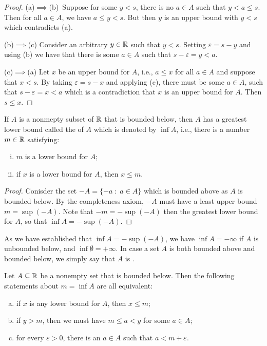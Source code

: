 \documentclass[11pt,a4paper]{article}
\begin{document}
\begin{proof}
    (a)$\implies$(b)\ Suppose for some $y<s$, there is no $a\in A$ such that $y<a\le s$. Then for all $a\in A$, we have $a\le y<s$. But then $y$ is an upper bound with $y<s$ which contradicts (a). 

    \noindent(b)$\implies$(c) Consider an arbitrary $y\in\mathbb{R}$ such that $y<s$. Setting $\varepsilon = s-y$ and using (b) we have that there is some $a\in A$ such that $s-\varepsilon = y<a$. 

    \noindent(c)$\implies$(a) Let $x$ be an upper bound for $A$, i.e., $a\le x$ for all $a\in A$ and suppose that $x<s$. By taking $\varepsilon = s-x$ and applying (c), there must be some $a\in A$, such that $s-\varepsilon = x<a$ which is a contradiction that $x$ is an upper bound for $A$. Then $s\le x$.
\end{proof}

\begin{theorem}
    If $A$ is a nonmepty subset of $\mathbb{R}$ that is bounded below, then $A$ has a greatest lower bound called the  of $A$ which is denoted by $\inf A$, i.e., there is a number $m\in \mathbb{R}$ satisfying:
    \begin{enumerate}[(i)]
        \item $m$ is a lower bound for $A$;
        \item if $x$ is a lower bound for $A$, then $x\le m$.
    \end{enumerate}
\end{theorem}

\begin{proof}
    Conisder the set $-A = \{-a\;:\;a\in A\}$ which is bounded above as $A$ is bounded below. By the completeness axiom, $-A$ must have a least upper bound $m = \sup (-A)$. Note that $-m = -\sup (-A)$ then the greatest lower bound for $A$, so that $\inf A = -\sup (-A)$.  
\end{proof}

\begin{remark}
    As we have established that $\inf A = -\sup (-A)$, we have $\inf A = -\infty$ if $A$ is unbounded below, and $\inf \emptyset = +\infty$. In case a set $A$ is both bounded above and bounded below, we simply say that $A$ is .
\end{remark}

\begin{proposition}
    Let $A\subseteq \mathbb{R}$ be a nonempty set that is bounded below. Then the following statements about $m = \inf A$ are all equivalent:
    \begin{enumerate}[(a)]
        \item if $x$ is any lower bound for $A$, then $x\le m$;
        \item if $y>m$, then we must have $m\le a< y$ for some $a\in A$;
        \item for every $\varepsilon>0$, there is an $a\in A$ such that $a<m+\varepsilon$.
    \end{enumerate}
\end{proposition}
\end{document}

